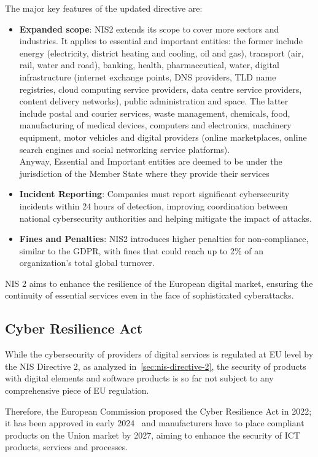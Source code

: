 The major key features of the updated directive are:~\cite{nis2-directive-faqs}
\begin{itemize}
  \item \textbf{Expanded scope}: NIS2 extends its scope to cover more sectors and industries. It applies to essential and important entities: the former include energy (electricity, district heating and cooling, oil and gas), transport (air, rail, water and road), banking, health, pharmaceutical, water, digital infrastructure (internet exchange points, DNS providers, TLD name registries, cloud computing service providers, data centre service providers, content delivery networks), public administration and space. The latter include postal and courier services, waste management, chemicals, food, manufacturing of medical devices, computers and electronics, machinery equipment, motor vehicles and digital providers (online marketplaces, online search engines and social networking service platforms).\\
        Anyway, Essential and Important entities are deemed to be under the jurisdiction of the Member State where they provide their services
  \item \textbf{Incident Reporting}: Companies must report significant cybersecurity incidents within 24 hours of detection, improving coordination between national cybersecurity authorities and helping mitigate the impact of attacks.
  \item \textbf{Fines and Penalties}: NIS2 introduces higher penalties for non-compliance, similar to the GDPR, with fines that could reach up to 2\% of an organization's total global turnover.
\end{itemize}

NIS 2 aims to enhance the resilience of the European digital market, ensuring the continuity of essential services even in the face of sophisticated cyberattacks.

\subsection{Cyber Resilience Act}

While the cybersecurity of providers of digital services is regulated at EU level by the NIS Directive 2, as analyzed in~\cref{sec:nis-directive-2}, the security of products with digital elements and software products is so far not subject to any comprehensive piece of EU regulation.~\cite{cra-eu}

Therefore, the European Commission proposed the Cyber Resilience Act in 2022; it has been approved in early 2024~\cite{cra-timelinel} and manufacturers have to place compliant products on the Union market by 2027, aiming to enhance the security of ICT products, services and processes.

